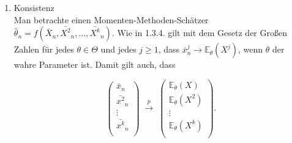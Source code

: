 \documentclass[10pt]{article}
\newcommand{\FZV}{X_1, \ldots, X_n} %
\newcommand{\EW}{\mathbb{E}} %
\newenvironment{BSP}[1][]
{\begin{Beispiel}[frametitle=#1]}{\end{Beispiel}}
\begin{document}
\begin{enumerate}
\begin{BSP}[Beispiel 1.3.3 (Erwartungstreue)]
\begin{enumerate}[label = (\roman*)]
			$\bar{x}$ ist eine lineare Funktion, $\bar{x^2}-\bar{x}^2$ allerdings nicht.  Daher ist der Schätzer für $\mu$ unverzerrt. 
			
			Die mögliche Erwartungstreue des Schätzers für $\sigma^2$ lässt sich folgendermaßen überprüfen:
			
			\begin{equation*}
				\EW_{\mu,\sigma^2} (\hat{\sigma}^2_{MM}) = \EW_{\mu,\sigma^2} (\bar{X^2}-\bar{X}^2) = \frac{n - 1 }{n} \sigma^2 < \sigma^2
			\end{equation*} (siehe Verschiebungssatz VO Grundzüge)
			
			\item Gleichverteilung\\
			Gegeben sind Zufallsvariablen $\FZV$ mit
			\begin{equation*}
				\FZV \overset{\textbf{i.i.d.}}{\sim} U([0,\theta_0]), \; \theta_0 >0 \;\textbf{mit}\; f(m) = 2m,
			\end{equation*}
			sodass
			\begin{equation*}
				\hat{\theta}_{MM} = 2\bar{x}
			\end{equation*}
			Dieser Schätzer bildet eine lineare Funktion. Daher ist der Schätzer erwartungstreu bzw. unverzerrt. 
		\end{enumerate}	
	\end{BSP}


	
	\item Konsistenz \\
	Man betrachte einen Momenten-Methoden-Schätzer $\hat{\theta}_n = f(\bar{X}_n, \bar{X^2}_n, \ldots, \bar{X^k}_n)$. Wie in 1.3.4. gilt mit dem Gesetz der Großen Zahlen für jedes $\theta \in \Theta$ und jedes $j \geq 1$, dass $\bar{x}^j_n \longrightarrow \EW_\theta (X^j)$, wenn $\theta$ der wahre Parameter ist. Damit gilt auch, dass
	
		\begin{equation*}
		\left(
		\begin{array}{c}
			\bar{x}_n\\
			\bar{x^2}_n\\
			\vdots\\
			\bar{x^k}_n\\
		\end{array}
		\right)\; \overset{p}\longrightarrow \;
		\left(
		\begin{array}{c}
			\EW_\theta(X)\\
			\EW_\theta(X^2)\\
			\vdots\\
			\EW_\theta(X^k) \\
		\end{array}
		\right).
	\end{equation*}


\end{enumerate}
\end{document}
